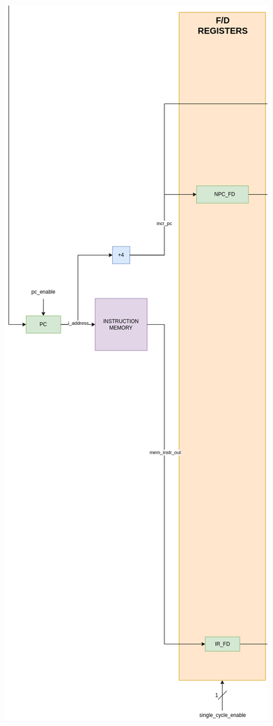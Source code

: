 \begin{figure}
\centering
\begin{minipage}{.5\textwidth}
  \centering
  \includegraphics[height=1.80\linewidth]{images/fetch_stage.png}
  \label{fig:fetch_stage}
\end{minipage}%
\begin{minipage}{.5\textwidth}
  \centering

\end{minipage}
\end{figure}
